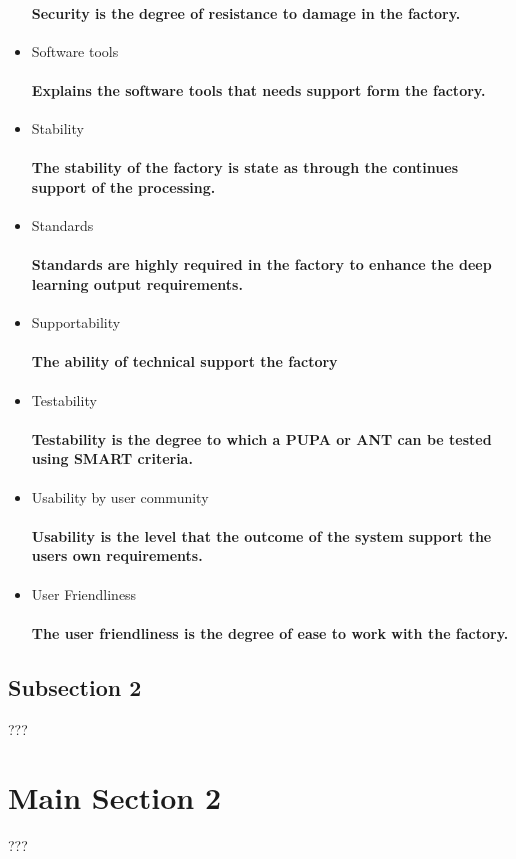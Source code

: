 \begin{itemize}
  \paragraph{Security is the degree of resistance to damage in the factory.}
  \item Software tools
  \paragraph{Explains the software tools that needs support form the factory.}
  \item Stability
  \paragraph{The stability of the factory is state as through the continues support of the processing.}
  \item Standards
  \paragraph{Standards are highly required in the factory to enhance the deep learning output requirements.}
  \item Supportability
  \paragraph{The ability of technical support the factory}
  \item Testability
  \paragraph{Testability is the degree to which a PUPA or ANT can be tested using SMART criteria.}
  \item Usability by user community
  \paragraph{Usability is the level that the outcome of the system support the users own requirements.}
  \item User Friendliness
  \paragraph{The user friendliness is the degree of ease to work with the factory.}
\end{itemize}


\subsection{Subsection 2}

???


\section{Main Section 2}

???
